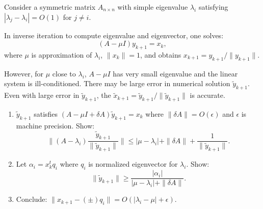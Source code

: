 \begin{exercise}
\label{applied:2016:4}
Consider a symmetric matrix $A_{n\times n}$ with simple eigenvalue $\lambda_{i}$ satisfying $| \lambda_{j}-\lambda_{i}|=O(1)$ for $j\neq i$.

In inverse iteration to compute eigenvalue and eigenvector, one solves:
\[
(A-\mu I)y_{k+1}=x_{k},
\]
where $\mu$ is approximation of $\lambda_{i}$, $\|x_{k}\|=1$, and obtains $x_{k+1}=y_{k+1}/\|y_{k+1}\|$.

However, for $\mu$ close to $\lambda_{i}$, $A-\mu I$ has very small eigenvalue and the linear system is ill-conditioned. There may be large error in numerical solution $\tilde{y}_{k+1}$. Even with large error in $\tilde{y}_{k+1}$, the $\tilde{x}_{k+1}=\tilde{y}_{k+1}/\|\tilde{y}_{k+1}\|$ is accurate.

\begin{enumerate}
\item[(1)] $\tilde{y}_{k+1}$ satisfies $(A-\mu I+\delta A)\tilde{y}_{k+1}=x_{k}$ where $\|\delta A\|=O(\epsilon)$ and $\epsilon$ is machine precision. Show:
\[
\|(A-\lambda_{i})\frac{\tilde{y}_{k+1}}{\|\tilde{y}_{k+1}\|}\|\leq|\mu-\lambda_{i}|+\|\delta A\|+\frac{1}{\|\tilde{y}_{k+1}\|}.
\]
\item[(2)] Let $\alpha_{i}=x_{k}^{t}q_{i}$ where $q_{i}$ is normalized eigenvector for $\lambda_{i}$. Show:
\[
\|\tilde{y}_{k+1}\|\geq\frac{|\alpha_{i}|}{|\mu-\lambda_{i}|+\|\delta A\|}.
\]
\item[(3)] Conclude: $\|x_{k+1}-(\pm)q_{i}\|=O(|\lambda_{i}-\mu|+\epsilon)$.
\end{enumerate}
\end{exercise}

